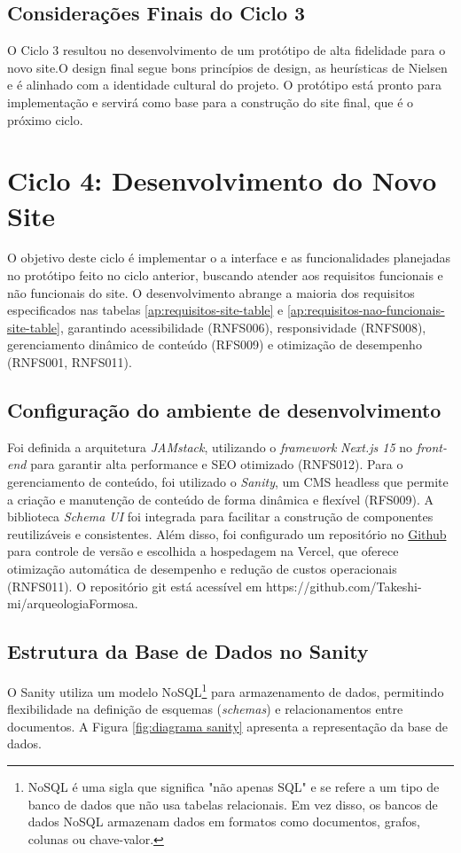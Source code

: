 \subsection*{Considerações Finais do Ciclo 3}
O Ciclo 3 resultou no desenvolvimento de um protótipo de alta fidelidade para o novo site.O design final segue bons princípios de design, as heurísticas de Nielsen e é alinhado com a identidade cultural do projeto. O protótipo está pronto para implementação e servirá como base para a construção do site final, que é o próximo ciclo. 

\section{Ciclo 4: Desenvolvimento do Novo Site}
\label{sec:ciclo4_desenvolvimento}

O objetivo deste ciclo é implementar o a interface e as funcionalidades planejadas no protótipo feito no ciclo anterior, buscando atender aos requisitos funcionais e não funcionais do site. O desenvolvimento abrange a maioria dos requisitos especificados nas tabelas \ref{ap:requisitos-site-table} e \ref{ap:requisitos-nao-funcionais-site-table}, garantindo acessibilidade (RNFS006), responsividade (RNFS008), gerenciamento dinâmico de conteúdo (RFS009) e otimização de desempenho (RNFS001, RNFS011).

    \subsection{Configuração do ambiente de desenvolvimento}
     Foi definida a arquitetura \textit{JAMstack}, utilizando o \textit{framework} \textit{Next.js 15} no \textit{front-end} para garantir alta performance e SEO otimizado (RNFS012). Para o gerenciamento de conteúdo, foi utilizado o \textit{Sanity}, um CMS headless que permite a criação e manutenção de conteúdo de forma dinâmica e flexível (RFS009). A biblioteca \textit{Schema UI} foi integrada para facilitar a construção de componentes reutilizáveis e consistentes. Além disso, foi configurado um repositório no \href{https://github.com/Takeshi-mi/arqueologiaFormosa}{Github} para controle de versão e escolhida a hospedagem na Vercel, que oferece otimização automática de desempenho e redução de custos operacionais (RNFS011). O repositório git está acessível em https://github.com/Takeshi-mi/arqueologiaFormosa.

    
    \subsection{Estrutura da Base de Dados no Sanity}
     O Sanity utiliza um modelo NoSQL\footnote{NoSQL é uma sigla que significa "não apenas SQL" e se refere a um tipo de banco de dados que não usa tabelas relacionais. Em vez disso, os bancos de dados NoSQL armazenam dados em formatos como documentos, grafos, colunas ou chave-valor.} para armazenamento de dados, permitindo flexibilidade na definição de esquemas (\textit{schemas}) e relacionamentos entre documentos. A Figura \ref{fig:diagrama sanity} apresenta a representação da base de dados.

